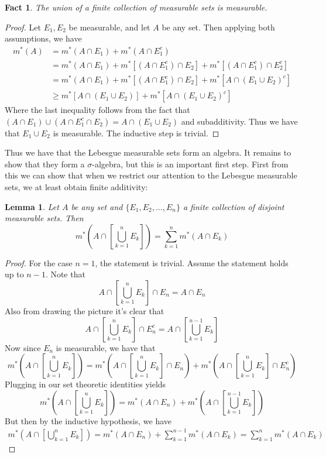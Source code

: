 \documentclass{article}
\theoremstyle{definition}
\theoremstyle{plain}
\theoremstyle{theorem}
\newtheorem{fact}{Fact}[section]
\newtheorem{lemma}{Lemma}[section]
\begin{document}
\begin{fact}
	The union of a finite collection of measurable sets is measurable.
\end{fact}
\begin{proof}
	Let $E_1,E_2$ be measurable, and let $A$ be any set. Then applying both assumptions, we have
	\begin{align}
		 m^*(A) &= m^*(A \cap E_1) + m^*(A \cap E_1^c) \\
		 	&= m^*(A \cap E_1) + m^*[(A \cap E_1^c) \cap E_2] + m^*[(A \cap E_1^c) \cap E_2^c] \\
		 	&= m^*(A \cap E_1) + m^*[(A \cap E_1^c) \cap E_2] + m^*[A \cap (E_1 \cup E_2)^c] \\
		 	&\geq m^*[A \cap (E_1 \cup E_2)] + m^*[A \cap (E_1 \cup E_2)^c]
	\end{align}
	Where the last inequality follows from the fact that $(A \cap E_1) \cup (A \cap E_1^c \cap E_2) = A \cap (E_1 \cup E_2)$ and subadditivity. Thus we have that $E_1 \cup E_2$ is measurable. The inductive step is trivial. 
\end{proof}
Thus we have that the Lebesgue measurable sets form an algebra. It remains to show that they form a $\sigma$-algebra, but this is an important first step. First from this we can show that when we restrict our attention to the Lebesgue measurable sets, we at least obtain finite additivity:
\begin{lemma}
	Let $A$ be any set and $\{E_1,E_2,...,E_n\}$ a finite collection of disjoint measurable sets. Then
	\[ m^*\left( A\cap \left[ \bigcup_{k=1}^n E_k \right] \right) = \sum_{k=1}^n m^*(A \cap E_k) \] 
\end{lemma}
\begin{proof}
	For the case $n=1$, the statement is trivial. Assume the statement holds up to $n-1$. Note that
	\[ A \cap \left[ \bigcup_{k=1}^n E_k \right] \cap E_n = A \cap E_n \]
Also from drawing the picture it's clear that
	\[ A \cap \left[ \bigcup_{k=1}^n E_k \right] \cap E_n^c = A \cap \left[ \bigcup_{k=1}^{n-1} E_k \right] \]
Now since $E_n$ is measurable, we have that
\[ m^*\left( A\cap \left[ \bigcup_{k=1}^n E_k \right] \right) = m^*\left( A\cap \left[ \bigcup_{k=1}^n E_k \right] \cap E_n \right) + m^*\left( A\cap \left[ \bigcup_{k=1}^n E_k \right] \cap E_n^c \right)	\]
Plugging in our set theoretic identities yields
	\[ m^*\left( A\cap \left[ \bigcup_{k=1}^n E_k \right] \right) = m^*(A \cap E_n) + m^*\left( A \cap \left[ \bigcup_{k=1}^{n-1} E_k \right] \right) \]
But then by the inductive hypothesis, we have
\begin{align*}
	m^*\left( A\cap \left[ \bigcup_{k=1}^n E_k \right] \right) = m^*(A \cap E_n) + \sum_{k=1}^{n-1}m^*(A \cap E_k) = \sum_{k=1}^n m^*(A \cap E_k)
\end{align*}
\end{proof}
\end{document}
